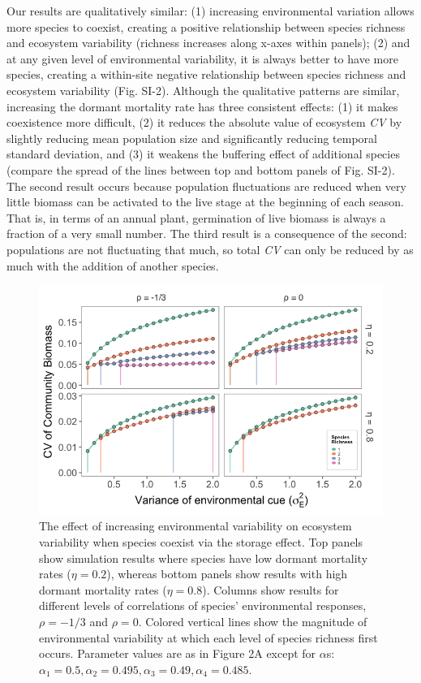 \documentclass[11pt,]{article}
\begin{document}
Our results are qualitatively similar: (1) increasing environmental
variation allows more species to coexist, creating a positive
relationship between species richness and ecosystem variability
(richness increases along x-axes within panels); (2) and at any given
level of environmental variability, it is always better to have more
species, creating a within-site negative relationship between species
richness and ecosystem variability (Fig. SI-2). Although the qualitative
patterns are similar, increasing the dormant mortality rate has three
consistent effects: (1) it makes coexistence more difficult, (2) it
reduces the absolute value of ecosystem \emph{CV} by slightly reducing
mean population size and significantly reducing temporal standard
deviation, and (3) it weakens the buffering effect of additional species
(compare the spread of the lines between top and bottom panels of Fig.
SI-2). The second result occurs because population fluctuations are
reduced when very little biomass can be activated to the live stage at
the beginning of each season. That is, in terms of an annual plant,
germination of live biomass is always a fraction of a very small number.
The third result is a consequence of the second: populations are not
fluctuating that much, so total \emph{CV} can only be reduced by as much
with the addition of another species.

\begin{figure}[!ht]
  \centering
      \includegraphics[width=6in]{./components/SI_storage_effect_two_etas.png}
  \caption{The effect of increasing environmental variability on ecosystem variability when species coexist via the storage effect. Top panels show simulation results where species have low dormant mortality rates ($\eta = 0.2$), whereas bottom panels show results with high dormant mortality rates ($\eta = 0.8$). Columns show results for different levels of correlations of species' environmental responses, $\rho = -1/3$ and $\rho = 0$. Colored vertical lines show the magnitude of environmental variability at which each level of species richness first occurs. Parameter values are as in Figure 2A except for $\alpha$s: $\alpha_1 = 0.5, \alpha_2 = 0.495, \alpha_3 = 0.49, \alpha_4 = 0.485$.}
\end{figure}
\end{document}
